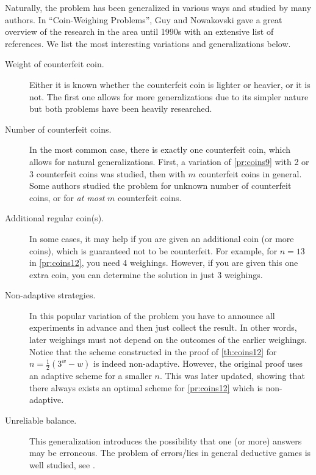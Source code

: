Naturally, the problem has been generalized in various ways and
  studied by many authors.
In ``Coin-Weighing Problems''\cite{coins-cwproblems1995}, Guy and Nowakovski
  gave a great overview of the research in the area until 1990s
  with an extensive list of references.
We list the most interesting variations and generalizations below.

\begin{description}
\item[Weight of counterfeit coin.]
  Either it is known whether the counterfeit coin is lighter or heavier,
  or it is not.
  The first one allows for more generalizations due to its simpler nature
  but both problems have been heavily researched.
\item[Number of counterfeit coins.]
  In the most common case, there is exactly one counterfeit coin,
    which allows for natural generalizations.
  First, a variation of \autoref{pr:coins9} with 2 or 3 counterfeit coins
   was studied\cite{coins-2fakes}\cite{coins-3fakes},
  then with $m$ counterfeit coins in general\cite{coins-mfakes}.
  Some authors studied the problem for unknown number of
  counterfeit coins\cite{coins-unknownfakes},
  or for \emph{at most} $m$ counterfeit coins\cite{coins-atmostfakes}.
\item[Additional regular coin(s).]
  In some cases, it may help if you are given an additional coin (or more coins),
    which is guaranteed not to be counterfeit.
  For example, for $n = 13$ in \autoref{pr:coins12}, you need 4 weighings.
  However, if you are given this one extra coin, you can determine the
    solution in just 3 weighings\cite{coins-dyson1946}.
\item[Non-adaptive strategies.]
  In this popular variation of the problem you have to announce all experiments
    in advance and then just collect the result.
  In other words, later weighings must not depend on the outcomes of the earlier weighings.
  Notice that the scheme constructed in the proof of \autoref{th:coins12} for
  $n = \frac{1}{2}(3^w - w)$ is indeed non-adaptive.
  However, the original proof uses an adaptive scheme for a smaller $n$.
  This was later updated, showing that there always exists an optimal scheme for
  \autoref{pr:coins12} which is non-adaptive\cite{coins-nonadaptive}.
\item[Unreliable balance.]
  This generalization introduces the possibility that
  one (or more) answers may be erroneous.
  The problem of errors/lies in general deductive games is well studied,
    see \cite{games-lies}.

\end{description}
